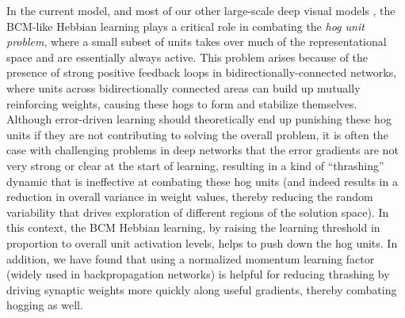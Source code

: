 \documentclass[11pt,twoside]{article}
\newif\myifpdf
\begin{document}

In the current model, and most of our other large-scale deep visual models \cite{OReillyWyatteHerdEtAl13}, the BCM-like Hebbian learning plays a critical role in combating the {\em hog unit problem}, where a small subset of units takes over much of the representational space and are essentially always active.  This problem arises because of the presence of strong positive feedback loops in bidirectionally-connected networks, where units across bidirectionally connected areas can build up mutually reinforcing weights, causing these hogs to form and stabilize themselves.  Although error-driven learning should theoretically end up punishing these hog units if they are not contributing to solving the overall problem, it is often the case with challenging problems in deep networks that the error gradients are not very strong or clear at the start of learning, resulting in a kind of ``thrashing'' dynamic that is ineffective at combating these hog units (and indeed results in a reduction in overall variance in weight values, thereby reducing the random variability that drives exploration of different regions of the solution space).  In this context, the BCM Hebbian learning, by raising the learning threshold in proportion to overall unit activation levels, helps to push down the hog units.  In addition, we have found that using a normalized momentum learning factor (widely used in backpropagation networks) is helpful for reducing thrashing by driving synaptic weights more quickly along useful gradients, thereby combating hogging as well.
\end{document}
